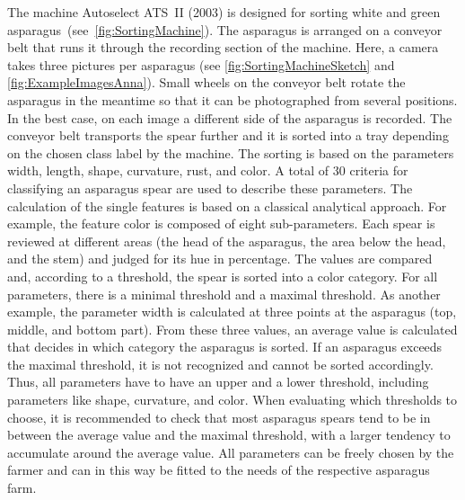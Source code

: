 The machine Autoselect ATS~II (2003) is designed for sorting white and green asparagus~\citep{autoselectanleitung}(see~\autoref{fig:SortingMachine}). The asparagus is arranged on a conveyor belt that runs it through the recording section of the machine. Here, a camera takes three pictures per asparagus (see \autoref{fig:SortingMachineSketch} and \autoref{fig:ExampleImagesAnna}). Small wheels on the conveyor belt rotate the asparagus in the meantime so that it can be photographed from several positions. In the best case, on each image a different side of the asparagus is recorded. The conveyor belt transports the spear further and it is sorted into a tray depending on the chosen class label by the machine. The sorting is based on the parameters width, length, shape, curvature, rust, and color. A total of 30 criteria for classifying an asparagus spear are used to describe these parameters. The calculation of the single features is based on a classical analytical approach. For example, the feature color is composed of eight sub-parameters. Each spear is reviewed at different areas (the head of the asparagus, the area below the head, and the stem) and judged for its hue in percentage. The values are compared and, according to a threshold, the spear is sorted into a color category. For all parameters, there is a minimal threshold and a maximal threshold. As another example, the parameter width is calculated at three points at the asparagus (top, middle, and bottom part). From these three values, an average value is calculated that decides in which category the asparagus is sorted. If an asparagus exceeds the maximal threshold, it is not recognized and cannot be sorted accordingly. Thus, all parameters have to have an upper and a lower threshold, including parameters like shape, curvature, and color. When evaluating which thresholds to choose, it is recommended to check that most asparagus spears tend to be in between the average value and the maximal threshold, with a larger tendency to accumulate around the average value. All parameters can be freely chosen by the farmer and can in this way be fitted to the needs of the respective asparagus farm.

